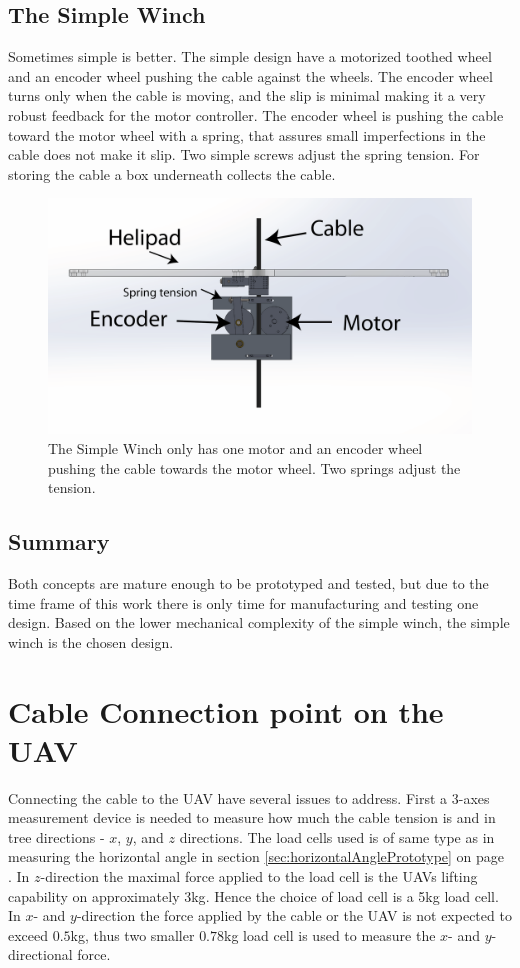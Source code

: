 \subsection{The Simple Winch}
Sometimes simple is better. The simple design have a motorized toothed wheel and an encoder wheel pushing the cable against the wheels. The encoder wheel turns only when the cable is moving, and the slip is minimal making it a very robust feedback for the motor controller. The encoder wheel is pushing the cable toward the motor wheel with a spring, that assures small imperfections in the cable does not make it slip. Two simple screws adjust the spring tension. For storing the cable a box underneath collects the cable.

\begin{figure}[H]
\centering
\includegraphics[scale=0.75]{graphics/cad/winch.png}
\caption[The Simple Winch]{The Simple Winch only has one motor and an encoder wheel pushing the cable towards the motor wheel. Two springs adjust the tension.}
\label{fig:winch}
\end{figure}

\subsection{Summary}
Both concepts are mature enough to be prototyped and tested, but due to the time frame of this work there is only time for manufacturing and testing one design. Based on the lower mechanical complexity of the simple winch, the simple winch is the chosen design.    


\section{Cable Connection point on the UAV}
Connecting the cable to the UAV have several issues to address. First a 3-axes measurement device is needed to measure how much the cable tension is and in tree directions - $x$, $y$, and $z$ directions. The load cells used is of same type as in measuring the horizontal angle in section \ref{sec:horizontalAnglePrototype} on page \pageref{sec:horizontalAnglePrototype}. In $z$-direction the maximal force applied to the load cell is the UAVs lifting capability on approximately 3kg\cite{Sidea2013}. Hence the choice of load cell is a 5kg load cell.\\
\noindent
In $x$- and $y$-direction the force applied by the cable or the UAV is not expected to exceed $0.5$kg, thus two smaller $0.78$kg load cell is used to measure the $x$- and $y$-directional force. 

